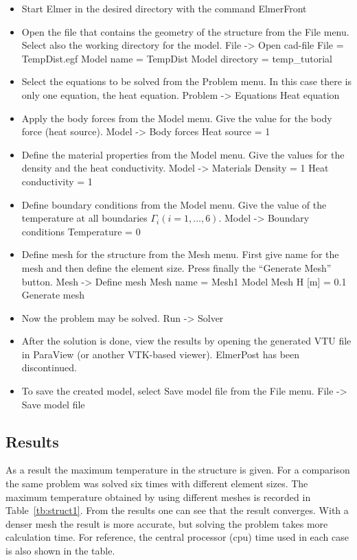 \begin{itemize}
\item Start Elmer in the desired directory with the command 
\ttbegin
ElmerFront
\ttend
\item Open the file that contains the geometry of the structure from 
the File menu. Select also the working directory for the model.
\ttbegin
File -> Open cad-file 
  File = TempDist.egf 
  Model name = TempDist 
  Model directory = temp_tutorial
\ttend
\item Select the equations to be solved from the Problem menu. In this 
case there is only one equation, the heat equation. 
\ttbegin
Problem -> Equations 
  Heat equation 
\ttend
\item Apply the body forces from the Model menu. Give the value for the body 
force (heat source). 
\ttbegin
Model -> Body forces 
  Heat source = 1
\ttend
\item Define the material properties from the Model menu. Give the values for 
the density and the heat conductivity. 
\ttbegin
Model -> Materials 
  Density = 1 
  Heat conductivity = 1
\ttend
\item Define boundary conditions from the Model menu. Give the value of the 
temperature at all boundaries $\Gamma_i (i=1,\ldots,6)$.
\ttbegin
Model -> Boundary conditions 
  Temperature = 0 
\ttend
\item Define mesh for the structure from the Mesh menu. First give name for 
the mesh and then define the element size. Press finally the ``Generate 
Mesh'' button.
\ttbegin
Mesh -> Define mesh 
  Mesh name = Mesh1 
  Model Mesh H [m] = 0.1 
  Generate mesh
\ttend
\item Now the problem may be solved.
\ttbegin
Run -> Solver 
\ttend
\item After the solution is done, view the results by opening the generated
VTU file in ParaView (or another VTK-based viewer). ElmerPost has been
discontinued.
\item To save the created model, select Save model file from the File menu.
\ttbegin
File -> Save model file 
\ttend
\end{itemize}

\subsection*{Results}

As a result the maximum temperature in the structure is given. For a
comparison the same problem was solved six times with different
element sizes. The maximum temperature obtained by using different
meshes is recorded in Table~\ref{tb:struct1}.  From the results one
can see that the result converges. With a denser mesh the result is
more accurate, but solving the problem takes more calculation time.
For reference, the central processor (cpu) time used in each case is
also shown in the table.

